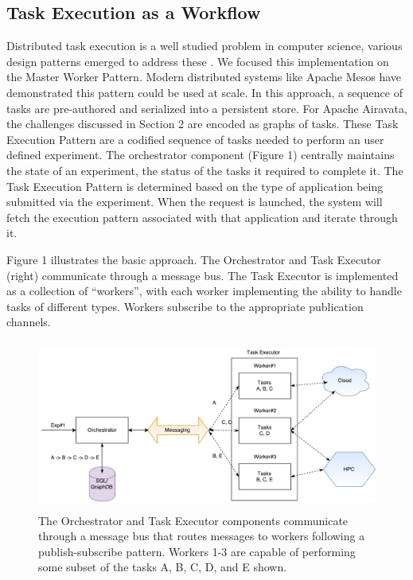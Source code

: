 \documentclass[review]{elsarticle}
\begin{document}
\subsection{Task Execution as a Workflow}
Distributed task execution is a well studied problem in computer science, various design patterns emerged to address these \cite{gamma1995design}. We focused this implementation on the Master Worker Pattern. Modern distributed systems like Apache Mesos\cite{apacheMesos} have demonstrated this pattern could be used at scale. In this approach, a sequence of tasks are pre-authored and serialized into a persistent store. For Apache Airavata, the challenges discussed in Section 2 are encoded as graphs of tasks. These Task Execution Pattern are a codified sequence of tasks needed to perform an user defined experiment.  The orchestrator component (Figure 1) centrally maintains the state of an experiment, the status of the tasks it required to complete it. The Task Execution Pattern is determined based on the type of application being submitted via the experiment.  When the request is launched, the system will fetch the execution pattern associated with that application and iterate through it.

Figure 1 illustrates the basic approach. The Orchestrator and Task Executor (right) communicate through a message bus.  The Task Executor is implemented as a collection of ``workers'', with each worker implementing the ability to handle tasks of different types. Workers subscribe to the appropriate publication channels.

\begin{figure}
\includegraphics[height=2.2in, width=4.8 in]{figures/figure1.pdf}
\caption{The Orchestrator and Task Executor components communicate through a message bus that routes messages to workers following a publish-subscribe pattern. Workers 1-3 are capable of performing some subset of the tasks A, B, C, D, and E shown.}
\end{figure}
\end{document}
